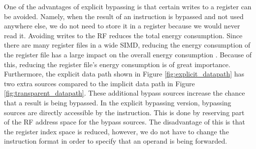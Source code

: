 

One of the advantages of explicit bypassing is that certain writes to a register can be avoided. Namely, when the result of an instruction is bypassed and not used anywhere else, we do not need to store it in a register because we would never read it. Avoiding writes to the RF reduces the total energy consumption. Since there are many register files in a wide SIMD, reducing the energy consumption of the register file has a large impact on the overall energy consumption \cite{dongrio1}. Because of this, reducing the register file's energy consumption is of great importance. Furthermore, the explicit data path shown in Figure \ref{fig:explicit_datapath} has two extra sources compared to the implicit data path in Figure \ref{fig:transparent_datapath}. These additional bypass sources increase the chance that a result is being bypassed. In the explicit bypassing version, bypassing sources are directly accessible by the instruction. This is done by reserving part of the RF address space for the bypass sources. The disadvantage of this is that the register index space is reduced, however, we do not have to change the instruction format in order to specify that an operand is being forwarded.


